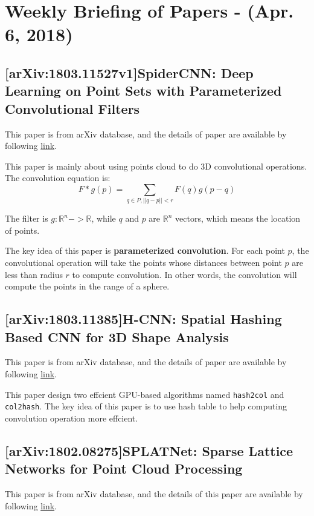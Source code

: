 \section{Weekly Briefing of Papers - (Apr. 6, 2018)}

\subsection{[arXiv:1803.11527v1]SpiderCNN: Deep Learning on Point Sets with
  Parameterized Convolutional Filters}

This paper is from arXiv database, and the details of paper are available by
following \href{https://arxiv.org/abs/1803.11527}{link}.

This paper is mainly about using points cloud to do 3D convolutional operations.
The convolution equation is:
$$
F * g(p) = \sum\limits_{q\in P, ||q-p|| < r}F(q)g(p-q)
$$

The filter is $ g: \mathbb{R}^n -> \mathbb{R} $, while $q$ and $p$ are
$\mathbb{R}^n$ vectors, which means the location of points.

The key idea of this paper is \textbf{parameterized convolution}.
For each point $p$, the convolutional operation will take the points whose distances
between point $p$ are less than radius $r$ to compute convolution.
In other words, the convolution will compute the points in the range of a
sphere.

\subsection{[arXiv:1803.11385]H-CNN: Spatial Hashing Based CNN for 3D Shape
  Analysis}

This paper is from arXiv database, and the details of paper are available by
following \href{https://arxiv.org/abs/1803.11385}{link}.

This paper design two effcient GPU-based algorithms named \lstinline|hash2col|
and \lstinline|col2hash|. The key idea of this paper is to use hash table to
help computing convolution operation more effcient.

\subsection{[arXiv:1802.08275]SPLATNet: Sparse Lattice Networks for Point Cloud
  Processing}

This paper is from arXiv database, and the details of this paper are available
by following \href{https://arxiv.org/abs/1802.08275}{link}.

